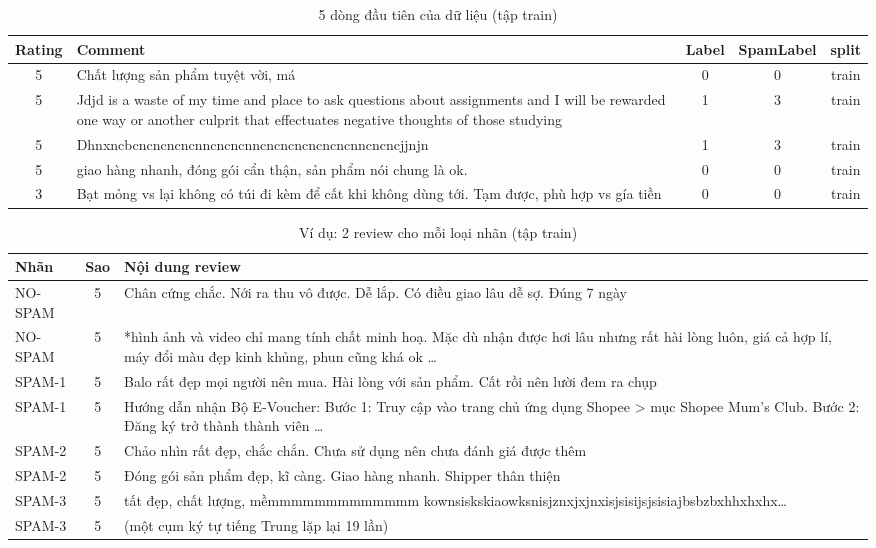 \begin{table}[H]
\centering
\caption{5 dòng đầu tiên của dữ liệu (tập train)}
\label{tab:text-head}
\small
\begin{tabular}{c>{\raggedright\arraybackslash}p{9.6cm}ccc}
\toprule
Rating & Comment & Label & SpamLabel & split\\
\midrule
5 & Chất lượng sản phẩm tuyệt vời, má & 0 & 0 & train\\
5 & Jdjd is a waste of my time and place to ask questions about assignments and I will be rewarded one way or another culprit that effectuates negative thoughts of those studying & 1 & 3 & train\\
5 & Dhnxncbcncncncncnncncncnncncncncncncncnncncncjjnjn & 1 & 3 & train\\
5 & giao hàng nhanh, đóng gói cẩn thận, sản phẩm nói chung là ok. & 0 & 0 & train\\
3 & Bạt mỏng vs lại không có túi đi kèm để cất khi không dùng tới. Tạm được, phù hợp vs gía tiền & 0 & 0 & train\\
\bottomrule
\end{tabular}
\end{table}

\begin{table}[H]
\centering
\caption{Ví dụ: 2 review cho mỗi loại nhãn (tập train)}
\label{tab:text-examples}
\small
\begin{tabular}{>{\raggedright\arraybackslash}p{2.0cm}c>{\raggedright\arraybackslash}p{11.4cm}}
\toprule
Nhãn & Sao & Nội dung review\\
\midrule
NO-SPAM & 5 & Chân cứng chắc. Nới ra thu vô được. Dễ lắp. Có điều giao lâu dễ sợ. Đúng 7 ngày\\
NO-SPAM & 5 & *hình ảnh và video chỉ mang tính chất minh hoạ. Mặc dù nhận được hơi lâu nhưng rất hài lòng luôn, giá cả hợp lí, máy đổi màu đẹp kinh khủng, phun cũng khá ok \ldots\\
SPAM-1 & 5 & Balo rất đẹp mọi người nên mua. Hài lòng với sản phẩm. Cất rồi nên lười đem ra chụp\\
SPAM-1 & 5 & Hướng dẫn nhận Bộ E-Voucher: Bước 1: Truy cập vào trang chủ ứng dụng Shopee > mục Shopee Mum's Club. Bước 2: Đăng ký trở thành thành viên \ldots\\
SPAM-2 & 5 & Chảo nhìn rất đẹp, chắc chắn. Chưa sử dụng nên chưa đánh giá được thêm\\
SPAM-2 & 5 & Đóng gói sản phẩm đẹp, kĩ càng. Giao hàng nhanh. Shipper thân thiện\\
SPAM-3 & 5 & tất đẹp, chất lượng, mềmmmmmmmmmmmmm kownsiskskiaowksnisjznxjxjnxisjsisijsjsisiajbsbzbxhhxhxhx\ldots\\
SPAM-3 & 5 & (một cụm ký tự tiếng Trung lặp lại 19 lần)\\
\bottomrule
\end{tabular}
\end{table}

